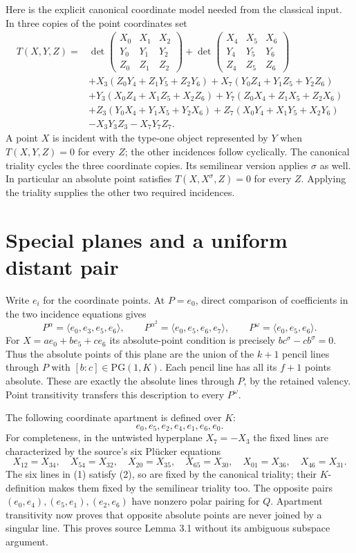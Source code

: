 \documentclass[11pt,a4paper]{article}
\newcommand{\gen}[1]{\langle #1\rangle}
\begin{document}
Here is the explicit canonical coordinate model needed from the classical
input. In three copies of the point coordinates set
\begin{align*}
T(X,Y,Z)={}&\det\begin{pmatrix}X_0&X_1&X_2\\Y_0&Y_1&Y_2\\Z_0&Z_1&Z_2\end{pmatrix}
+\det\begin{pmatrix}X_4&X_5&X_6\\Y_4&Y_5&Y_6\\Z_4&Z_5&Z_6\end{pmatrix}\\
&+X_3(Z_0Y_4+Z_1Y_5+Z_2Y_6)+X_7(Y_0Z_4+Y_1Z_5+Y_2Z_6)\\
&+Y_3(X_0Z_4+X_1Z_5+X_2Z_6)+Y_7(Z_0X_4+Z_1X_5+Z_2X_6)\\
&+Z_3(Y_0X_4+Y_1X_5+Y_2X_6)+Z_7(X_0Y_4+X_1Y_5+X_2Y_6)\\
&-X_3Y_3Z_3-X_7Y_7Z_7.
\end{align*}
A point $X$ is incident with the type-one object represented by $Y$ when
$T(X,Y,Z)=0$ for every $Z$; the other incidences follow cyclically.
The canonical triality cycles the three coordinate copies. Its semilinear
version applies $\sigma$ as well. In particular an absolute point satisfies
$T(X,X^\sigma,Z)=0$ for every $Z$. Applying the triality supplies the other
two required incidences.

\section{Special planes and a uniform distant pair}
Write $e_i$ for the coordinate points. At $P=e_0$, direct comparison of
coefficients in the two incidence equations gives
\[
 P^\alpha=\gen{e_0,e_3,e_5,e_6},\qquad
 P^{\alpha^2}=\gen{e_0,e_5,e_6,e_7},\qquad
 P^\omega=\gen{e_0,e_5,e_6}.
\]
For $X=a e_0+b e_5+c e_6$ its absolute-point condition is precisely
$bc^\sigma-cb^\sigma=0$. Thus the absolute points of this plane are the
union of the $k+1$ pencil lines through $P$ with $[b:c]\in\mathrm{PG}(1,K)$.
Each pencil line has all its $f+1$ points absolute. These are exactly the
absolute lines through $P$, by the retained valency. Point transitivity
transfers this description to every $P^\omega$.

The following coordinate apartment is defined over $K$:
\[
                  e_0,e_5,e_2,e_4,e_1,e_6,e_0.             \tag{1}
\]
For completeness, in the untwisted hyperplane $X_7=-X_3$ the fixed lines
are characterized by the source's six Pl\"ucker equations
\[
X_{12}=X_{34},\quad X_{54}=X_{32},\quad X_{20}=X_{35},\quad
X_{65}=X_{30},\quad X_{01}=X_{36},\quad X_{46}=X_{31}.       \tag{2}
\]
The six lines in (1) satisfy (2), so are fixed by the canonical triality;
their $K$-definition makes them fixed by the semilinear triality too.
The opposite pairs $(e_0,e_4),(e_5,e_1),(e_2,e_6)$ have nonzero polar pairing
for $Q$. Apartment transitivity now proves that opposite absolute points
are never joined by a singular line. This proves source Lemma 3.1 without
its ambiguous subspace argument.
\end{document}
